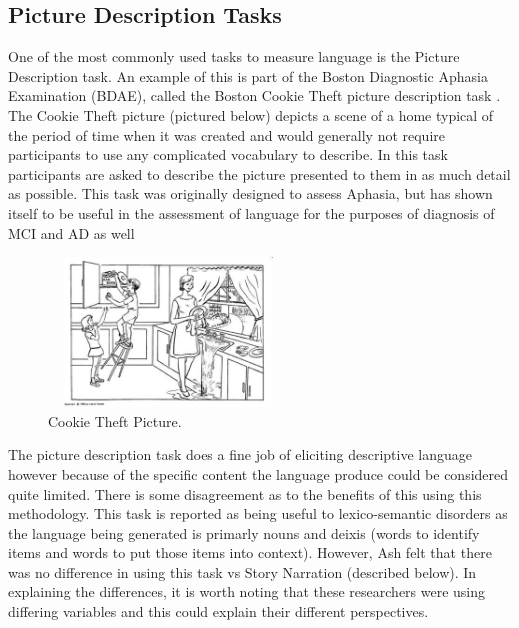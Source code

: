 \documentclass[10pt, letterpaper, twoside, openany]{book}
\begin{document}
\subsection{Picture Description Tasks}
One of the most commonly used tasks to measure language is the Picture Description task. An example of this is part of the Boston Diagnostic Aphasia Examination (BDAE), called the Boston Cookie Theft picture description task \cite{Borod1980}. The Cookie Theft picture (pictured below) depicts a scene of a home typical of the period of time when it was created and would generally not require participants to use any complicated vocabulary to describe. In this task participants are asked to describe the picture presented to them in as much detail as possible.  This task was originally designed to assess Aphasia, but has shown itself to be useful in the assessment of language for the purposes of diagnosis of MCI and AD as well \cite{Giles1996}
\begin{figure}[H]
\centering
\includegraphics[width=240px, height=150px]{images/BCTPicture.png}
\caption{Cookie Theft Picture.\label{white}}
\end{figure}
\par
The picture description task does a fine job of eliciting descriptive language however because of the specific content the language produce could be considered quite limited. There is some disagreement as to the benefits of this using this methodology. This task is reported as being useful to lexico-semantic disorders \cite{Boschi2017, Sajjadi2012} as the language being generated is primarly nouns and deixis (words to identify items and words to put those items into context). However, Ash \cite{Ash2012}felt that there was no difference in using this task vs Story Narration (described below). In explaining the differences, it is worth noting that these researchers were using differing variables and this could explain their different perspectives.
\par
\end{document}
